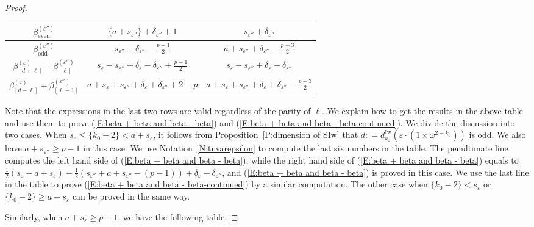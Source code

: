 \documentclass[12pt]{amsart}
\theoremstyle{definition}
\numberwithin{equation}{subsection}
\newcommand{\Iw}{\mathrm{Iw}}
\newcommand{\even}{\mathrm{even}}
\newcommand{\odd}{\mathrm{odd}}
\begin{document}
\begin{proof}
\begin{center}
\begin{tabular}{|c|c|c|}
\\
\hline 
$\beta^{(\varepsilon'')}_\even$ & $\{a+s_{\varepsilon''}\}  + \delta_{\varepsilon''}+1$& $s_{\varepsilon''} + \delta_{\varepsilon''}$
\\
\hline 
$\beta^{(\varepsilon'')}_\odd$ & $s_{\varepsilon''} + \delta_{\varepsilon''} -\frac{p-1}2$&$a+s_{\varepsilon''} + \delta_{\varepsilon''} - \frac{p-3}2$
\\
\hline  $\beta_{[d+\ell]}^{(\varepsilon)} - \beta_{[\ell]}^{(\varepsilon'')}$ & $s_\varepsilon -s_{\varepsilon''} +  \delta_\varepsilon - \delta_{\varepsilon''} +\frac{p-1}2$ & $s_\varepsilon - s_{\varepsilon''} + \delta_{\varepsilon } - \delta_{\varepsilon''}$
\\
\hline
$\beta_{[d-\ell]}^{(\varepsilon)} + \beta_{[\ell-1]}^{(\varepsilon'')}$  & $a+  s_\varepsilon + s_{\varepsilon''} + \delta_\varepsilon + \delta_{\varepsilon ''} +2-p$ & $a+  s_\varepsilon + s_{\varepsilon''} + \delta_\varepsilon + \delta_{\varepsilon ''} -\frac{p-3}2$
\\
\hline
\end{tabular}
\end{center}
Note that the expressions in the last two rows are valid regardless of the parity of $\ell$. We explain how to get the results in the above table and use them to prove (\ref{E:beta + beta and beta - beta}) and (\ref{E:beta + beta and beta - beta-continued}). We divide the discussion into two cases. When $s_\varepsilon\leq  \{k_0-2\} < a+s_\varepsilon$, it follows from Proposition~\ref{P:dimension of SIw} that $d: = d_{k_0}^\Iw(\varepsilon\cdot (1\times \omega^{2-k_0}))$ is odd. We also have $a+s_{\varepsilon''}\geq p-1$ in this case. We use Notation~\ref{N:tnvarepsilon} to compute the last six numbers in the table. The penultimate line computes the left hand side of (\ref{E:beta + beta and beta - beta}), while the right hand side of (\ref{E:beta + beta and beta - beta}) equals to $\frac 12(s_\varepsilon+a+s_\varepsilon)-\frac 12(s_{\varepsilon''}+a+s_{\varepsilon''}-(p-1))+\delta_\varepsilon-\delta_{\varepsilon''}$, and (\ref{E:beta + beta and beta - beta}) is proved in this case. We use the last line in the table to prove (\ref{E:beta + beta and beta - beta-continued}) by a similar computation. The other case when $\{k_0-2\}< s_\varepsilon $ or $\{k_0-2\} \geq a+s_\varepsilon$ can be proved in the same way. 

Similarly, when $a + s_\varepsilon \geq p-1$, we have the following table.


\end{proof}
\end{document}

